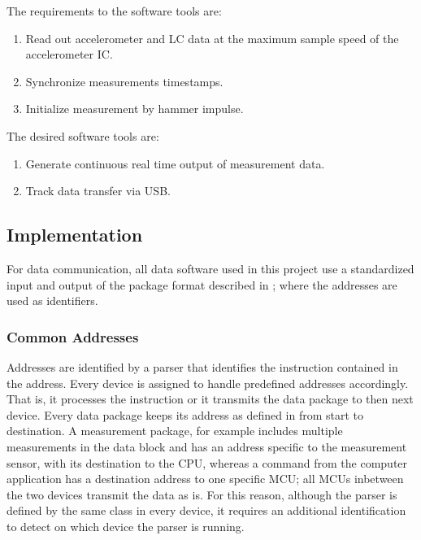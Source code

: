 The requirements to the software tools are:
\begin{enumerate}
  \item Read out accelerometer and \ac{LC} data at the maximum sample speed of the accelerometer \ac{IC}.\label{req:read_out}
  \item Synchronize measurements timestamps.\label{req:sync}
  \item Initialize measurement by hammer impulse.\label{req:init}
\end{enumerate}

The desired software tools are:
\begin{enumerate}[resume]
  \item Generate continuous real time output of measurement data.\label{des:cont_out}
  \item Track data transfer via \ac{USB}.\label{des:dat_track}
\end{enumerate}

\subsection{Implementation}

For data communication, all data software used in this project use a standardized input and output of the package format described in ; where the addresses are used as identifiers.

\subsubsection{Common Addresses}
Addresses are identified by a parser that identifies the instruction contained in the address. Every device is assigned to handle predefined addresses accordingly. That is, it processes the instruction or it transmits the data package to then next device. Every data package keeps its address as defined in  from start to destination. A measurement package, for example includes multiple measurements in the data block and has an address specific to the measurement sensor, with its destination to the \ac{CPU}, whereas a command from the computer application has a destination address to one specific \ac{MCU}; all \ac{MCU}s inbetween the two devices transmit the data as is. For this reason, although the parser is defined by the same class in every device, it requires an additional identification to detect on which device the parser is running.

